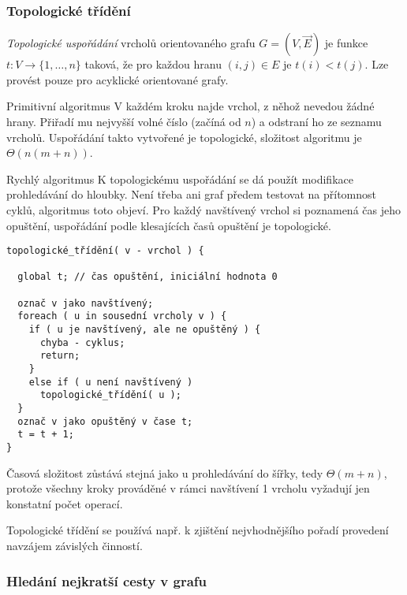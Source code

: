 \subsubsection*{Topologické třídění}

\begin{definice}
\emph{Topologické uspořádání} vrcholů orientovaného grafu $G=(V,\overrightarrow{E})$ je funkce $t:V\to \{1,\dots,n\}$ taková, že pro každou hranu $(i,j)\in E$ je $t(i)<t(j)$. Lze provést pouze pro acyklické orientované grafy.
\end{definice}

\begin{algoritmusN}{Primitivní algoritmus}
V každém kroku najde vrchol, z něhož nevedou žádné hrany. Přiřadí mu nejvyšší volné číslo (začíná od $n$) a odstraní ho ze seznamu vrcholů. Uspořádání takto vytvořené je topologické, složitost algoritmu je $\Theta(n(m+n))$.
\end{algoritmusN}

\begin{algoritmusN}{Rychlý algoritmus}
K topologickému uspořádání se dá použít modifikace prohledávání do hloubky. Není třeba ani graf předem testovat na přítomnost cyklů, algoritmus toto objeví. Pro každý navštívený vrchol si poznamená čas jeho opuštění, uspořádání podle klesajících časů opuštění je topologické.
\begin{verbatim}
topologické_třídění( v - vrchol ) {

  global t; // čas opuštění, iniciální hodnota 0

  označ v jako navštívený;
  foreach ( u in sousední vrcholy v ) {
    if ( u je navštívený, ale ne opuštěný ) {
      chyba - cyklus;
      return;
    }
    else if ( u není navštívený )
      topologické_třídění( u );
  }
  označ v jako opuštěný v čase t;
  t = t + 1;
}
\end{verbatim}
Časová složitost zůstává stejná jako u prohledávání do šířky, tedy $\Theta(m+n)$, protože všechny kroky prováděné v rámci navštívení 1 vrcholu vyžadují jen konstatní počet operací.
\end{algoritmusN}

\begin{poznamka}
Topologické třídění se používá např. k zjištění nejvhodnějšího pořadí provedení navzájem závislých činností.
\end{poznamka}

\subsubsection*{Hledání nejkratší cesty v grafu}

